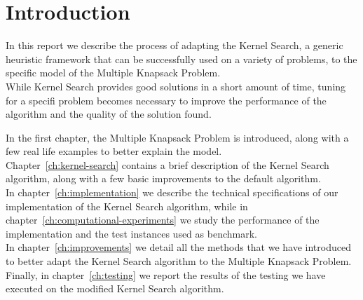\chapter{Introduction}

In this report we describe the process of adapting the Kernel Search,
a generic heuristic framework that can be successfully used on a variety of
problems, to the specific model of the Multiple Knapsack Problem.\\
While Kernel Search provides good solutions in a short amount of time,
tuning for a specifi problem becomes necessary to improve the performance of the algorithm
and the quality of the solution found.

In the first chapter, the Multiple Knapsack Problem is introduced,
along with a few real life examples to better explain the model.\\
Chapter~\ref{ch:kernel-search} contains a brief description of the Kernel Search algorithm,
along with a few basic improvements to the default algorithm.\\
In chapter~\ref{ch:implementation} we describe the technical
specifications of our implementation of the Kernel Search algorithm,
while in chapter~\ref{ch:computational-experiments} we study
the performance of the implementation and the test instances used as benchmark.\\
In chapter~\ref{ch:improvements} we detail all
the methods that we have introduced to better adapt the Kernel Search
algorithm to the Multiple Knapsack Problem.\\
Finally, in chapter~\ref{ch:testing} we report the results of the testing we have
executed on the modified Kernel Search algorithm.

